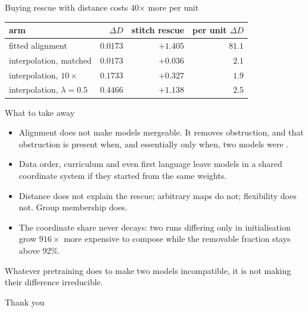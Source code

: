 \documentclass{beamer}
\begin{document}
\begin{frame}{Buying rescue with distance costs 40$\times$ more per unit}
  \centering
  \small
  \begin{tabular}{lrrr}
\toprule
arm & $\Delta D$ & stitch rescue & per unit $\Delta D$ \\
\midrule
fitted alignment       & $0.0173$ & $\mathbf{+1.405}$ & $\mathbf{81.1}$ \\
interpolation, matched & $0.0173$ & $+0.036$ & $2.1$ \\
interpolation, $10\times$ & $0.1733$ & $+0.327$ & $1.9$ \\
interpolation, $\lambda{=}0.5$ & $0.4466$ & $+1.138$ & $2.5$ \\
\bottomrule
\end{tabular}
\end{frame}

\begin{frame}{What to take away}
  \begin{itemize}
    \item Alignment does not make models mergeable. It removes  obstruction, and
          that obstruction is present when, and essentially only when, two models were
          .
    \item Data order, curriculum and even first language leave models in a shared coordinate
          system if they started from the same weights.
    \item Distance does not explain the rescue; arbitrary maps do not; flexibility does not.
          \alert{Group membership does.}
    \item The coordinate share never decays: two runs differing only in initialisation grow
          $916\times$ more expensive to compose while the removable fraction stays above 92\%.
  \end{itemize}
  \vfill
  \begin{block}{}
    Whatever pretraining does to make two models incompatible, it is not making their difference
    irreducible.
  \end{block}
\end{frame}

\begin{frame}
  \centering\Large Thank you
\end{frame}
\end{document}
